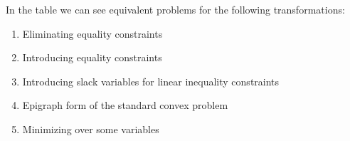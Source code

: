 %
In the table we can see equivalent problems for the following transformations:

\begin{enumerate}
    \item Eliminating equality constraints 
    \item Introducing equality constraints
    \item Introducing slack variables for linear inequality constraints
    \item Epigraph form of the standard convex problem
    \item Minimizing over some variables
\end{enumerate}
